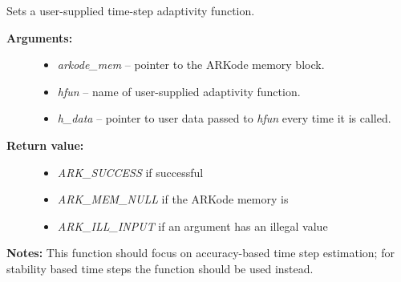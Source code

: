 \documentclass[letterpaper,10pt,english]{sphinxmanual}
\begin{document}

\begin{fulllineitems}
\label{c_interface/User_callable:ARKodeSetAdaptivityFn}
Sets a user-supplied time-step adaptivity function.
\begin{description}
\item[{\textbf{Arguments:}}] \leavevmode\begin{itemize}
\item {} 
\emph{arkode\_mem} -- pointer to the ARKode memory block.

\item {} 
\emph{hfun} -- name of user-supplied adaptivity function.

\item {} 
\emph{h\_data} -- pointer to user data passed to \emph{hfun} every time
it is called.

\end{itemize}

\item[{\textbf{Return value:}}] \leavevmode\begin{itemize}
\item {} 
\emph{ARK\_SUCCESS} if successful

\item {} 
\emph{ARK\_MEM\_NULL} if the ARKode memory is 

\item {} 
\emph{ARK\_ILL\_INPUT} if an argument has an illegal value

\end{itemize}

\end{description}

\textbf{Notes:} This function should focus on accuracy-based time step
estimation; for stability based time steps the function
{\hyperref[c_interface/User_callable:ARKodeSetStabilityFn]{}} should be used instead.

\end{fulllineitems}

\end{document}
